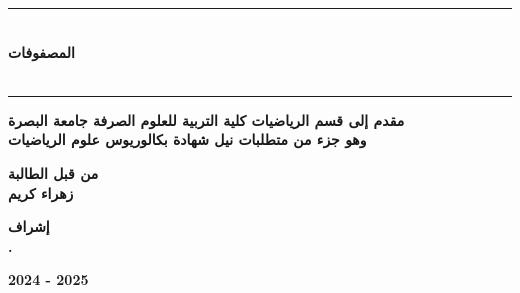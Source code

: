 \begin{titlepage}
	\vspace{1cm}
	
	\begin{center}
		\rule{100mm}{0.5mm}\\
		\vspace{1cm}
		\large \textbf{المصفوفات}\\
		\large \textbf{}\\
		\vspace{12pt}
		\rule{100mm}{0.5mm}
	\end{center}
	\vfill
	\begin{center}
		\large
		\textbf{مقدم إلى قسم الرياضيات كلية التربية للعلوم الصرفة جامعة البصرة\\
			\vspace{6pt}
			وهو جزء من متطلبات نيل شهادة بكالوريوس علوم الرياضيات}
	\end{center}
	\vfill
	\begin{center}
		\large
		\textbf{من قبل الطالبة}\\
		\vspace{8pt}
		 \large
		\textbf{زهراء كريم}
	\end{center}
	\vspace{10pt}
	\begin{center}
		\large
		\textbf{إشراف}\\
		\vspace{8pt}
		 \large
		\textbf{.}
	\end{center}
	\vspace{10pt}
	\begin{center}
		\large 
		\textbf{2024 - 2025}
	\end{center}
\end{titlepage}
